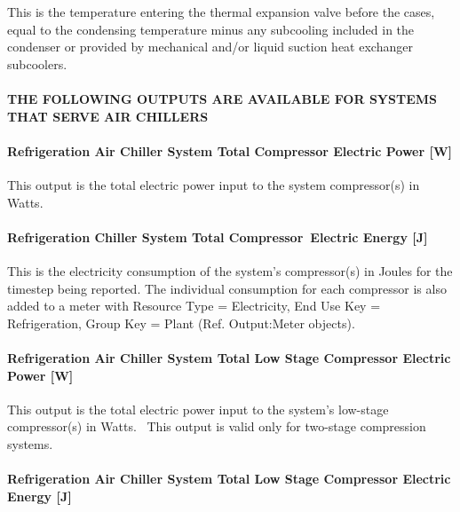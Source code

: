 This is the temperature entering the thermal expansion valve before the cases, equal to the condensing temperature minus any subcooling included in the condenser or provided by mechanical and/or liquid suction heat exchanger subcoolers.

\paragraph{THE FOLLOWING OUTPUTS ARE AVAILABLE FOR SYSTEMS THAT SERVE AIR CHILLERS}\label{the-following-outputs-are-available-for-systems-that-serve-air-chillers}

\paragraph{Refrigeration Air Chiller System Total Compressor Electric Power {[}W{]}}\label{refrigeration-air-chiller-system-total-compressor-electric-power-w}

This output is the total electric power input to the system compressor(s) in Watts.

\paragraph{Refrigeration Chiller System Total Compressor~Electric Energy {[}J{]}}\label{refrigeration-chiller-system-total-compressorelectric-energy-j}

This is the electricity consumption of the system's compressor(s) in Joules for the timestep being reported. The individual consumption for each compressor is also added to a meter with Resource Type = Electricity, End Use Key = Refrigeration, Group Key = Plant (Ref. Output:Meter objects).

\paragraph{Refrigeration Air Chiller System Total Low Stage Compressor Electric Power {[}W{]}}\label{refrigeration-air-chiller-system-total-low-stage-compressor-electric-power-w}

This output is the total electric power input to the system's low-stage compressor(s) in Watts.~ This output is valid only for two-stage compression systems.

\paragraph{Refrigeration Air Chiller System Total Low Stage Compressor Electric Energy {[}J{]}}\label{refrigeration-air-chiller-system-total-low-stage-compressor-electric-energy-j}

